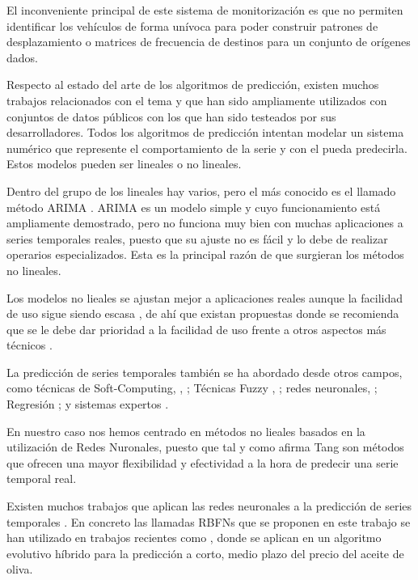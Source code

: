 \documentclass[runningheads]{llncs}
\begin{document}
 
El inconveniente principal de este sistema de monitorización es que no permiten identificar los
vehículos de forma unívoca para poder construir patrones de desplazamiento o matrices de frecuencia
de destinos para un conjunto de orígenes dados. 

Respecto al estado del arte de los algoritmos de predicción, existen muchos trabajos relacionados
con el tema y que han sido ampliamente utilizados con conjuntos de datos públicos con los que han
sido testeados por sus desarrolladores. Todos los algoritmos de predicción intentan modelar un
sistema numérico que represente el comportamiento de la serie y con el pueda predecirla. Estos
modelos pueden ser lineales o no lineales. 

Dentro del grupo de los lineales hay varios, pero el más conocido es el llamado método ARIMA
\cite{BoxJenk}. ARIMA es un modelo simple y cuyo funcionamiento está ampliamente demostrado, pero
no funciona muy bien con muchas aplicaciones a series temporales reales, puesto que su ajuste no es
fácil y lo debe de realizar operarios especializados. Esta es la principal razón de que surgieran
los métodos no lineales. 

Los modelos no lieales se ajustan mejor a aplicaciones reales aunque la facilidad de uso sigue
siendo escasa \cite{Clements2004}, de ahí que existan propuestas donde se recomienda que se le debe
dar prioridad a la facilidad de uso frente a otros aspectos más técnicos \cite{Gooijer25years}.

La predicción de series temporales también se ha abordado desde otros campos, como técnicas de
Soft-Computing, \cite{Samanta2011}, \cite{Zhu2011}; Técnicas Fuzzy \cite{Qiu2011}, \cite{Wang2011};
redes neuronales, \cite{Yu2010}; Regresión \cite{Kavaklioglu2011}; y sistemas expertos
\cite{Dash1995}.

En nuestro caso nos hemos centrado en métodos no lieales basados en la utilización de Redes
Nuronales, puesto que tal y como afirma Tang \cite{Tang1991} son métodos que ofrecen una mayor
flexibilidad y efectividad a la hora de predecir una serie temporal real. 

Existen muchos trabajos que aplican las redes neuronales a la predicción de series temporales
\cite{Rivas04}. En concreto las llamadas RBFNs que se proponen en este trabajo se han utilizado en
trabajos recientes como \cite{Hippert10,Lee09}, \cite{PerezGodoy2010} donde se aplican en un
algoritmo evolutivo híbrido para la predicción a corto, medio plazo del precio del aceite de oliva.
\end{document}
